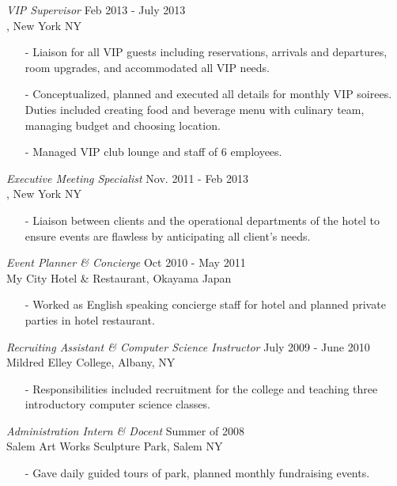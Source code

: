 \documentclass[margin, 5pt]{res} %
\begin{document}
\begin{resume}
{\sl VIP Supervisor} \hfill Feb 2013 - July 2013\\
\sheraton, New York NY
\begin{itemize} \itemsep 0pt
\item[-] Liaison for all VIP guests including reservations, arrivals and departures, room upgrades, and accommodated all VIP needs.
\item[-] Conceptualized, planned and executed all details for monthly VIP soirees. Duties included creating food and beverage menu with culinary team, managing budget and choosing location.
\item[-] Managed VIP club lounge and staff of 6 employees.
\end{itemize}

{\sl Executive Meeting Specialist} \hfill Nov. 2011 - Feb 2013\\
\sheraton, New York NY
\begin{itemize} \itemsep 0pt
\item[-] Liaison between clients and the operational departments of the hotel to ensure events are flawless by anticipating all client's needs.
\end{itemize}

{\sl Event Planner \& Concierge} \hfill Oct 2010 - May 2011 \\
My City Hotel \& Restaurant, Okayama Japan
\begin{itemize} \itemsep 0pt
\item[-] Worked as English speaking concierge staff for hotel and planned private parties in hotel restaurant.
\end{itemize}

{\sl Recruiting Assistant \& Computer Science Instructor} \hfill July 2009 - June 2010 \\
Mildred Elley College, Albany, NY
\begin{itemize} \itemsep 0pt
\item[-] Responsibilities included recruitment for the college and teaching three introductory computer science classes.
\end{itemize}

{\sl Administration Intern \& Docent} \hfill Summer of 2008 \\
Salem Art Works Sculpture Park, Salem NY
\begin{itemize} \itemsep 0pt
\item[-] Gave daily guided tours of park, planned monthly fundraising events. 
\end{itemize}


\end{resume}
\end{document}
